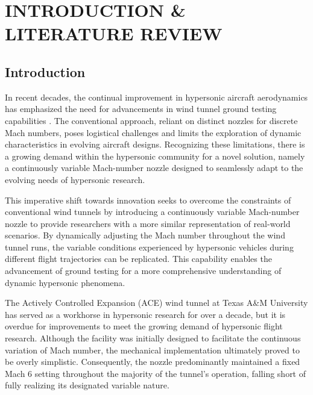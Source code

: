 %
%  
%



\pagestyle{plain} %
\setcounter{page}{1}


\chapter{INTRODUCTION \& LITERATURE REVIEW}

\section{Introduction}

In recent decades, the continual improvement in hypersonic aircraft aerodynamics has emphasized the need for advancements in wind tunnel ground testing capabilities \cite{leyva}. The conventional approach, reliant on distinct nozzles for discrete Mach numbers, poses logistical challenges and limits the exploration of dynamic characteristics in evolving aircraft designs. Recognizing these limitations, there is a growing demand within the hypersonic community for a novel solution, namely a continuously variable Mach-number nozzle designed to seamlessly adapt to the evolving needs of hypersonic research.

This imperative shift towards innovation seeks to overcome the constraints of conventional wind tunnels by introducing a continuously variable Mach-number nozzle to provide researchers with a more similar representation of real-world scenarios. By dynamically adjusting the Mach number throughout the wind tunnel runs, the variable conditions experienced by hypersonic vehicles during different flight trajectories can be replicated. This capability enables the advancement of ground testing for a more comprehensive understanding of dynamic hypersonic phenomena.

The Actively Controlled Expansion (ACE) wind tunnel at Texas A\&M University has served as a workhorse in hypersonic research for over a decade, but it is overdue for improvements to meet the growing demand of hypersonic flight research. Although the facility was initially designed to facilitate the continuous variation of Mach number, the mechanical implementation ultimately proved to be overly simplistic. Consequently, the nozzle predominantly maintained a fixed Mach 6 setting throughout the majority of the tunnel's operation, falling short of fully realizing its designated variable nature.

